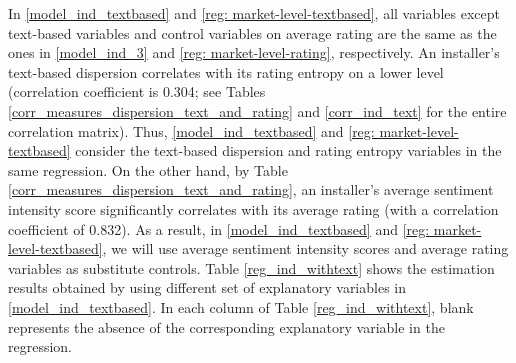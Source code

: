 \documentclass[mnsc,blindrev]{informs3}
\begin{document}
	In \eqref{model_ind_textbased} and \eqref{reg: market-level-textbased}, all variables except text-based variables and control variables on average rating are the same as the ones in \eqref{model_ind_3} and \eqref{reg: market-level-rating}, respectively. An installer's text-based dispersion correlates with its rating entropy on a lower level (correlation coefficient is 0.304; see Tables \ref{corr_measures_dispersion_text_and_rating} and \ref{corr_ind_text} for the entire correlation matrix). Thus, \eqref{model_ind_textbased} and \eqref{reg: market-level-textbased} consider the text-based dispersion and rating entropy variables in the same regression. On the other hand, by Table \ref{corr_measures_dispersion_text_and_rating}, an installer's average sentiment intensity score significantly correlates with its average rating (with a correlation coefficient of 0.832). As a result, in \eqref{model_ind_textbased} and \eqref{reg: market-level-textbased},  we will use average sentiment intensity scores and average rating variables as substitute controls. Table \ref{reg_ind_withtext} shows the estimation results obtained by using different set of explanatory variables in \eqref{model_ind_textbased}. In each column of Table \ref{reg_ind_withtext}, blank represents the absence of the corresponding explanatory variable in the regression.
	
	
\end{document}

